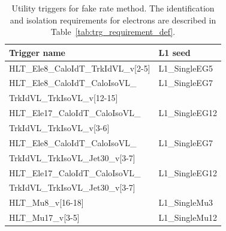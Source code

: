 \begin{table}[!ht]
  \begin{center}
 {\small
  \begin{tabular} {l|l}
\hline
 Trigger name & L1 seed \\
\hline\hline
 HLT\_Ele8\_CaloIdT\_TrkIdVL\_v[2-5]	& L1\_SingleEG5 		\\ %
 HLT\_Ele8\_CaloIdT\_CaloIsoVL\_		& L1\_SingleEG7 		\\ 
 TrkIdVL\_TrkIsoVL\_v[12-15]			&  						\\ %
 HLT\_Ele17\_CaloIdT\_CaloIsoVL\_  		& L1\_SingleEG12		\\ 
 TrkIdVL\_TrkIsoVL\_v[3-6]  			& 						\\ %
 HLT\_Ele8\_CaloIdT\_CaloIsoVL\_      	& L1\_SingleEG7         \\
 TrkIdVL\_TrkIsoVL\_Jet30\_v[3-7]      	& 						\\ %
 HLT\_Ele17\_CaloIdT\_CaloIsoVL\_		& L1\_SingleEG12		\\ 
 TrkIdVL\_TrkIsoVL\_Jet30\_v[3-7]		& 						\\ %
	\hline \hline
 HLT\_Mu8\_v[16-18] 	&  L1\_SingleMu3  		\\ %
 HLT\_Mu17\_v[3-5]      &  L1\_SingleMu12   	\\ %
    \hline 
  \end{tabular}
}
  \caption{Utility triggers for fake rate method. %
  The identification and isolation requirements for electrons are described in Table~\ref{tab:trg_requirement_def}.
}
   \label{tab:triggers_util}
  \end{center}
\end{table}

